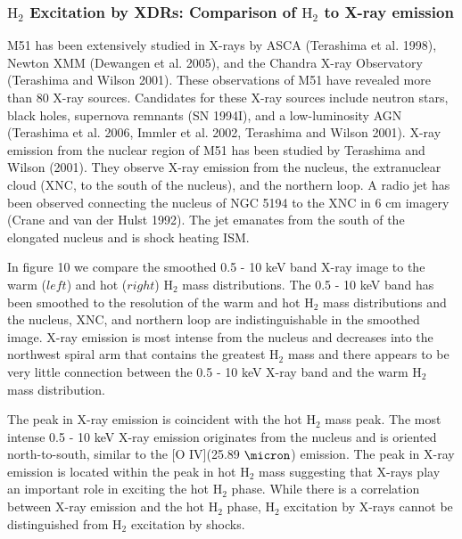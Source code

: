 \documentclass[manuscript]{aastex}
\begin{document}

\subsubsection{$\mathrm{H_2}$ Excitation by XDRs: Comparison of $\mathrm{H_2}$ to X-ray emission}

M51 has been extensively studied in X-rays by ASCA (Terashima et al. 1998), Newton XMM (Dewangen et al. 2005), and  the Chandra X-ray Observatory (Terashima and Wilson 2001). These observations of M51 have revealed more than 80 X-ray sources.  Candidates for these X-ray sources include neutron stars, black holes, supernova remnants (SN 1994I), and a low-luminosity AGN (Terashima et al. 2006, Immler et al. 2002, Terashima and Wilson 2001).  X-ray emission from the nuclear region of M51 has been studied by Terashima and Wilson (2001).  They observe X-ray emission from the nucleus, the extranuclear cloud (XNC, to the south of the nucleus), and the northern loop.  A radio jet has been observed connecting the nucleus of NGC 5194 to the XNC in 6 cm imagery (Crane and van der Hulst 1992).  The jet emanates from the south of the elongated nucleus and is shock heating ISM.

In figure 10 we compare the smoothed 0.5 - 10 keV band X-ray image to the warm ($left$) and hot ($right$) $\mathrm{H_2}$ mass distributions.  The 0.5 - 10 keV band has been smoothed to the resolution of the warm and hot $\mathrm{H_2}$ mass distributions and the nucleus, XNC, and northern loop are indistinguishable in the smoothed image.  X-ray emission is most intense from the nucleus and decreases into the northwest spiral arm that contains the greatest $\mathrm{H_2}$ mass and there appears to be very little connection between the 0.5 - 10 keV X-ray band and the warm $\mathrm{H_2}$ mass distribution.  

The peak in X-ray emission is coincident with the hot $\mathrm{H_2}$ mass peak. The most intense 0.5 - 10 keV X-ray emission originates from the nucleus and is oriented north-to-south, similar to the [O IV](25.89 $\micron$) emission.
The peak in X-ray emission is located within the peak in hot $\mathrm{H_2}$ mass suggesting that X-rays play an important role in exciting the hot $\mathrm{H_2}$ phase.  While there is a correlation between X-ray emission and the hot $\mathrm{H_2}$ phase, $\mathrm{H_2}$ excitation by X-rays cannot be distinguished from $\mathrm{H_2}$ excitation by shocks.  
\end{document}
